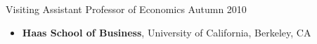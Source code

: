 \documentclass[11pt]{article}
\newenvironment{innerlist}[1][\enskip\textbullet]%
        {\begin{itemize}[#1,leftmargin=*,parsep=0pt,itemsep=0pt,topsep=0pt,partopsep=0pt]}
        {\end{itemize}}
\begin{document}
%


Visiting Assistant Professor of Economics \hfill {Autumn 2010}
\begin{innerlist}
	\item[] \textbf{Haas School of Business}, University of California, Berkeley, CA
\end{innerlist}

%
\end{document}
